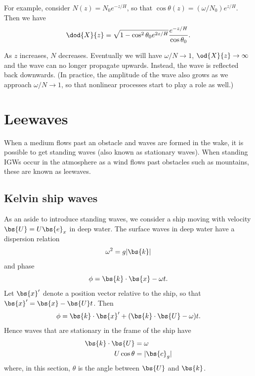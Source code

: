 For example, consider $N(z) = N_0 e^{-z/H}$, so that $\cos\theta(z) =
(\omega/N_0) e^{z/H}$. Then we have 
\begin{equation}
    \dod{X}{z} = \sqrt{1 - \cos^2 \theta_0 e^{2z/H}} \frac{e^{-z/H}}{\cos\theta_0}.
\end{equation}

As $z$ increases, $N$ decreases. Eventually we will have $\omega/N \rightarrow
1$, $\od{X}{z} \rightarrow \infty$ and the wave can no longer propagate upwards.
Instead, the wave is reflected back downwards. (In practice, the amplitude of
the wave also grows as we approach $\omega/N\rightarrow1$, so that nonlinear
processes start to play a role as well.)

\section{Leewaves}

When a medium flows past an obstacle and waves are formed in the wake, it is
possible to get standing waves (also known as stationary waves). When standing
IGWs occur in the atmosphere as a wind flows past obstacles such as mountains,
these are known as leewaves.

\subsection{Kelvin ship waves}

As an aside to introduce standing waves, we consider a ship moving with velocity
$\bs{U} = U\bs{e}_x$ in deep water. The surface waves in deep water have a
dispersion relation
\begin{equation}
\omega^2 = g|\bs{k}|
\end{equation}
and phase
\begin{equation}
	\phi = \bs{k}\cdot\bs{x} - \omega t.
\end{equation}
Let $\bs{x}'$ denote a position vector relative to the ship, so that $\bs{x}' =
\bs{x} - \bs{U}t$. Then
\begin{equation}
	\phi = \bs{k}\cdot\bs{x}' + (\bs{k}\cdot\bs{U} - \omega) t.
\end{equation}
Hence waves that are stationary in the frame of the ship have
\begin{align}
	\bs{k}\cdot\bs{U} &= \omega \\
	U\cos\theta &= |\bs{c}_g|
\end{align}
where, in this section, $\theta$ is the angle between $\bs{U}$ and $\bs{k}$. 

